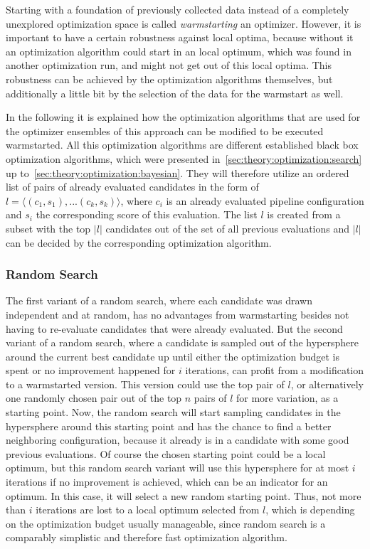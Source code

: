 Starting with a foundation of previously collected data instead of a completely unexplored optimization space is called \textit{warmstarting} an optimizer.
However, it is important to have a certain robustness against local optima, because without it an optimization algorithm could start in an local optimum, which was found in another optimization run, and might not get out of this local optima.
This robustness can be achieved by the optimization algorithms themselves, but additionally a little bit by the selection of the data for the warmstart as well.

In the following it is explained how the optimization algorithms that are used for the optimizer ensembles of this approach can be modified to be executed warmstarted.
All this optimization algorithms are different established black box optimization algorithms, which were presented in~\ref{sec:theory:optimization:search} up to~\ref{sec:theory:optimization:bayesian}.
They will therefore utilize an ordered list of pairs of already evaluated candidates in the form of $l = \langle (c_1, s_1), ... (c_k, s_k) \rangle$, where $c_i$ is an already evaluated pipeline configuration and $s_i$ the corresponding score of this evaluation.
The list $l$ is created from a subset with the top $|l|$ candidates out of the set of all previous evaluations and $|l|$ can be decided by the corresponding optimization algorithm.

\subsubsection{Random Search}
The first variant of a random search, where each candidate was drawn independent and at random, has no advantages from warmstarting besides not having to re-evaluate candidates that were already evaluated.\newline
But the second variant of a random search, where a candidate is sampled out of the hypersphere around the current best candidate up until either the optimization budget is spent or no improvement happened for $i$ iterations, can profit from a modification to a warmstarted version.
This version could use the top pair of $l$, or alternatively one randomly chosen pair  out of the top $n$ pairs of $l$ for more variation, as a starting point.\newline
Now, the random search will start sampling candidates in the hypersphere around this starting point and has the chance to find a better neighboring configuration, because it already is in a candidate with some good previous evaluations.\newline
Of course the chosen starting point could be a local optimum, but this random search variant will use this hypersphere for at most $i$ iterations if no improvement is achieved, which can be an indicator for an optimum.
In this case, it will select a new random starting point.
Thus, not more than $i$ iterations are lost to a local optimum selected from $l$, which is depending on the optimization budget usually manageable, since random search is a comparably simplistic and therefore fast optimization algorithm.

